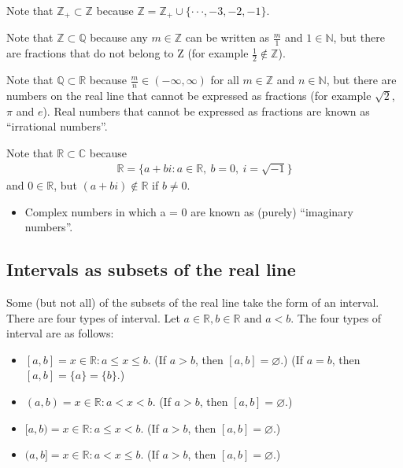 \documentclass[letterpaper,10pt,english]{jupyterBook}
\begin{document}
\sphinxAtStartPar
Note that \(\mathbb{Z}_+ \subset \mathbb{Z}\) because \(\mathbb{Z} = \mathbb{Z}_+ \cup \{ · · · , −3, −2, −1 \}\).

\sphinxAtStartPar
Note that \(\mathbb{Z} \subset \mathbb{Q}\) because any \(m \in \mathbb{Z}\) can be written as \(\frac{m}{1}\) and \(1 \in \mathbb{N}\), but there are fractions that do not belong to Z (for example \(\frac{1}{2} \notin \mathbb{Z}\)).

\sphinxAtStartPar
Note that \(\mathbb{Q} \subset \mathbb{R}\) because \(\frac{m}{n} \in (−\infty, \infty)\) for all \(m \in \mathbb{Z}\) and \(n \in \mathbb{N}\), but there are numbers on the real line that cannot be expressed as fractions (for example \(\sqrt{2}\), \(\pi\) and \(e\)). Real numbers that cannot be expressed as fractions are known as “irrational numbers”.

\sphinxAtStartPar
Note that \(\mathbb{R} \subset \mathbb{C}\) because
\begin{equation*}
\begin{split}\mathbb{R} = \{ a + bi : a \in \mathbb{R}, \: b = 0, \: i = \sqrt{−1} \}\end{split}
\end{equation*}
\sphinxAtStartPar
and \(0 \in \mathbb{R}\), but \((a + bi) \notin \mathbb{R}\) if \(b \neq 0\).
\begin{itemize}
\item {} 
\sphinxAtStartPar
Complex numbers in which a = 0 are known as (purely) “imaginary numbers”.

\end{itemize}


\subsection{Intervals as subsets of the real line}
\label{\detokenize{02.sets_numbers_coordinates_distances:intervals-as-subsets-of-the-real-line}}
\sphinxAtStartPar
Some (but not all) of the subsets of the real line take the form of an
interval. There are four types of interval. Let \(a \in \mathbb{R}, b \in \mathbb{R} \text{ and } a < b\). The four types of interval are as follows:
\begin{itemize}
\item {} 
\sphinxAtStartPar
\([a, b] = {x \in \mathbb{R} : a \leqslant x \leqslant b}\). (If \(a > b\), then \([a, b] = \varnothing\).) (If \(a = b\), then \([a, b] = \{a\} = \{b\}\).)

\item {} 
\sphinxAtStartPar
\((a, b) = {x \in \mathbb{R} : a < x < b}\). (If \(a > b\), then \([a, b] = \varnothing\).)

\item {} 
\sphinxAtStartPar
\([a, b) = {x \in \mathbb{R} : a \leqslant x < b}\). (If \(a > b\), then \([a, b] = \varnothing\).)

\item {} 
\sphinxAtStartPar
\((a, b] = {x \in \mathbb{R} : a < x \leqslant b}\). (If \(a > b\), then \([a, b] = \varnothing\).)

\end{itemize}
\end{document}
